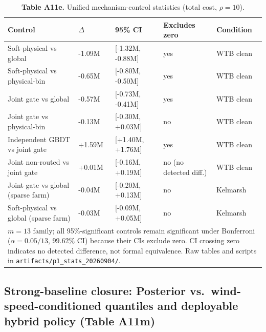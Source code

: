 \documentclass[
  journal]{IEEEtran}
\begin{document}
\begin{table}[!t]
\centering
\fontsize{8.0pt}{9.6pt}\selectfont
\setlength{\tabcolsep}{2.0pt}
\renewcommand{\arraystretch}{1.05}
\caption*{\textbf{Table A11e.} Unified mechanism-control statistics (total cost, $\rho=10$).}
%
\begin{tabular}{lllll}
\toprule
Control & $\Delta$ & 95\% CI & Excludes zero & Condition \\
\midrule
Soft-physical vs global & -1.09M & [-1.32M, -0.88M] & yes & WTB clean \\
Soft-physical vs physical-bin & -0.65M & [-0.80M, -0.50M] & yes & WTB clean \\
Joint gate vs global & -0.57M & [-0.73M, -0.41M] & yes & WTB clean \\
Joint gate vs physical-bin & -0.13M & [-0.30M, +0.03M] & no & WTB clean \\
Independent GBDT vs joint gate & +1.59M & [+1.40M, +1.76M] & yes & WTB clean \\
Joint non-routed vs joint gate & +0.01M & [-0.16M, +0.19M] & no (no detected diff.) & WTB clean \\
Joint gate vs global (sparse farm) & -0.04M & [-0.20M, +0.13M] & no & Kelmarsh \\
Soft-physical vs global (sparse farm) & -0.03M & [-0.09M, +0.05M] & no & Kelmarsh \\
\midrule
\multicolumn{5}{p{0.96\columnwidth}}{\fontsize{8.0pt}{9.6pt}\selectfont $m=13$ family; all 95\%-significant controls remain significant under Bonferroni ($\alpha=0.05/13$, 99.62\% CI) because their CIs exclude zero. CI crossing zero indicates no detected difference, not formal equivalence. Raw tables and scripts in \texttt{artifacts/p1\_stats\_20260904/}.} \\
\bottomrule
\end{tabular}
\end{table}

\FloatBarrier

\subsection*{Strong-baseline closure: Posterior
vs.~wind-speed-conditioned quantiles and deployable hybrid policy (Table
A11m)}\label{strong-baseline-closure-posterior-vs.-wind-speed-conditioned-quantiles-and-deployable-hybrid-policy-table-a11m}
\end{document}
